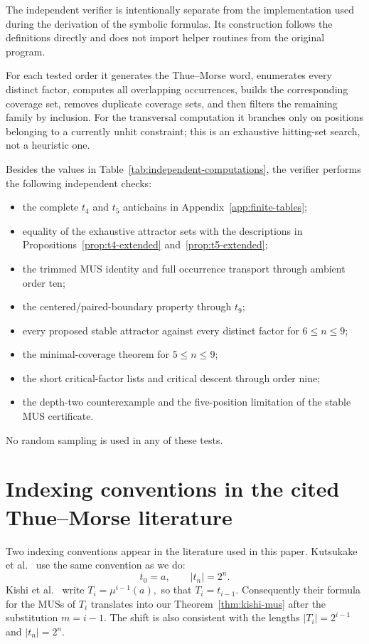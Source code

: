 \documentclass[10pt,a4paper]{article}
\theoremstyle{definition}\newtheorem{definition}[theorem]{Definition}
\theoremstyle{remark}\newtheorem{remark}[theorem]{Remark}
\begin{document}
The independent verifier is intentionally separate from the implementation used during the derivation of the symbolic formulas.  Its construction follows the definitions directly and does not import helper routines from the original program.

For each tested order it generates the Thue--Morse word, enumerates every distinct factor, computes all overlapping occurrences, builds the corresponding coverage set, removes duplicate coverage sets, and then filters the remaining family by inclusion.  For the transversal computation it branches only on positions belonging to a currently unhit constraint; this is an exhaustive hitting-set search, not a heuristic one.

Besides the values in Table~\ref{tab:independent-computations}, the verifier performs the following independent checks:
\begin{itemize}
\item the complete $t_4$ and $t_5$ antichains in Appendix~\ref{app:finite-tables};
\item equality of the exhaustive attractor sets with the descriptions in Propositions~\ref{prop:t4-extended} and~\ref{prop:t5-extended};
\item the trimmed MUS identity and full occurrence transport through ambient order ten;
\item the centered/paired-boundary property through $t_9$;
\item every proposed stable attractor against every distinct factor for $6\le n\le9$;
\item the minimal-coverage theorem for $5\le n\le9$;
\item the short critical-factor lists and critical descent through order nine;
\item the depth-two counterexample and the five-position limitation of the stable MUS certificate.
\end{itemize}

No random sampling is used in any of these tests.


\section{Indexing conventions in the cited Thue--Morse literature}
\label{app:indexing}

Two indexing conventions appear in the literature used in this paper.  Kutsukake et al.~\cite{Kutsukake2020} use the same convention as we do:
\[
 t_0=a,
 \qquad
 |t_n|=2^n.
\]
Kishi et al.~\cite{Kishi2026} write
$
 T_i=\mu^{i-1}(a),
$
so that
$
 T_i=t_{i-1}.
$
Consequently their formula for the MUSs of $T_i$ translates into our Theorem~\ref{thm:kishi-mus} after the substitution $m=i-1$.  The shift is also consistent with the lengths $|T_i|=2^{i-1}$ and $|t_n|=2^n$.




\end{document}
